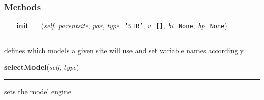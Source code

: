 
  \subsubsection{Methods}

    \label{Epigrass:simobj:popmodels:__init__}

    \vspace{0.5ex}

    \begin{boxedminipage}{\textwidth}

    \raggedright \textbf{\_\_init\_\_}(\textit{self}, \textit{parentsite}, \textit{par}, \textit{type}=\texttt{'SIR'}, \textit{v}=\texttt{[]}, \textit{bi}=\texttt{None}, \textit{bp}=\texttt{None})

    \vspace{-1.5ex}

    \rule{\textwidth}{0.5\fboxrule}
    defines which models a given site will use and set variable names 
    accordingly.

    \vspace{1ex}

    \end{boxedminipage}

    \label{Epigrass:simobj:popmodels:selectModel}

    \vspace{0.5ex}

    \begin{boxedminipage}{\textwidth}

    \raggedright \textbf{selectModel}(\textit{self}, \textit{type})

    \vspace{-1.5ex}

    \rule{\textwidth}{0.5\fboxrule}
    sets the model engine

    \vspace{1ex}

    \end{boxedminipage}


